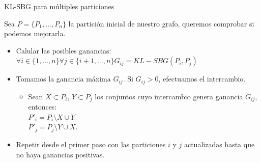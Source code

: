 


\begin{frame}{KL-SBG para múltiples particiones}

  Sea $P = \{P_1, \ldots, P_n\}$ la partición inicial de nuestro grafo,
  queremos comprobar si podemos mejorarla.

  \begin{itemize}
    \item Calular las posibles ganancias:
    $\forall i \in \{1, \ldots, n\} \forall j \in \{i+1, \ldots, n\}
          G_{ij} = KL-SBG(P_i, P_j)$

    \item Tomamos la ganancia máxima $G_{ij}$. Si $G_{ij} > 0$, efectuamos el
    intercambio.

    \begin{itemize}
      \item Sean $X \subset P_i$, $Y \subset P_j$ los conjuntos cuyo intercambio
      genera ganancia $G_{ij}$, entonces:\\
        $P'_i = P_i \setminus X \cup Y$\\
        $P'_j = P_j \setminus Y \cup X$.
    \end{itemize}

    \item Repetir desde el primer paso con las particiones $i$ y $j$ actualizadas
    hasta que no haya ganancias positivas.
  \end{itemize}

\end{frame}



